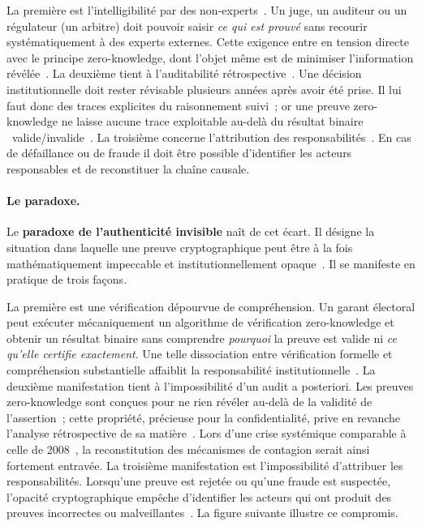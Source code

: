 \begin{sloppypar}
La premi\`ere est l'intelligibilit\'e par des non-experts~\cite{Kerr04,Daubert1993}. Un juge, un
auditeur ou un r\'egulateur (un arbitre) doit pouvoir saisir \emph{ce qui est prouv\'e} sans recourir
syst\'ematiquement \`a des experts externes. Cette exigence entre en tension directe
avec le principe zero-knowledge, dont l'objet m\^eme est de minimiser
l'information r\'ev\'el\'ee~\cite{BenSasson2019,PLONK20}. La deuxi\`eme tient \`a l'auditabilit\'e r\'etrospective~\cite{Twining1999}.
Une d\'ecision institutionnelle doit rester r\'evisable plusieurs ann\'ees apr\`es
avoir \'et\'e prise. Il lui faut donc des traces explicites du raisonnement suivi~;
or une preuve zero-knowledge ne laisse aucune trace exploitable
au-del\`a du r\'esultat binaire \guillemotleft~valide/invalide~\guillemotright. La troisi\`eme
concerne l'attribution des responsabilit\'es~\cite{Citron14}. En cas de d\'efaillance ou de fraude
il doit \^etre possible d'identifier les acteurs responsables et de reconstituer
la cha\^ine causale.

\paragraph{Le paradoxe.}
\label{par:paradoxe_def}

Le \textbf{paradoxe de l'authenticit\'e invisible} na\^it de cet \'ecart. Il d\'esigne
la situation dans laquelle une preuve cryptographique peut \^etre \`a la fois math\'ematiquement
impeccable et institutionnellement opaque~\cite{Doshi-Velez17,Adadi2018,Barredo2020}. Il se
manifeste en pratique de trois fa\c{c}ons.

La premi\`ere est une v\'erification d\'epourvue de compr\'ehension. Un garant \'electoral peut ex\'ecuter
m\'ecaniquement un algorithme de v\'erification zero-knowledge et obtenir
un r\'esultat binaire sans comprendre \emph{pourquoi} la preuve est
valide ni \emph{ce qu'elle certifie exactement}. Une telle dissociation
entre v\'erification formelle et compr\'ehension substantielle affaiblit la
responsabilit\'e institutionnelle~\cite{Adams1999,Cranor05}. La deuxi\`eme manifestation tient \`a l'impossibilit\'e d'un audit a posteriori. Les
preuves zero-knowledge sont con\c{c}ues pour ne rien r\'ev\'eler
au-del\`a de la validit\'e de l'assertion~; cette propri\'et\'e, pr\'ecieuse pour
la confidentialit\'e, prive en revanche l'analyse r\'etrospective de sa mati\`ere~\cite{Androulaki13,Meiklejohn13}.
Lors d'une crise syst\'emique comparable \`a celle de 2008~\cite{FCIC2011}, la reconstitution des
m\'ecanismes de contagion serait ainsi fortement entrav\'ee. La troisi\`eme manifestation est l'impossibilit\'e d'attribuer les responsabilit\'es.
Lorsqu'une preuve est rejet\'ee ou qu'une fraude est suspect\'ee, l'opacit\'e
cryptographique emp\^eche d'identifier les acteurs qui ont produit des preuves incorrectes ou
malveillantes~\cite{FinckMoscon19,DeFilippi16}. La figure suivante illustre ce compromis.


\end{sloppypar}
